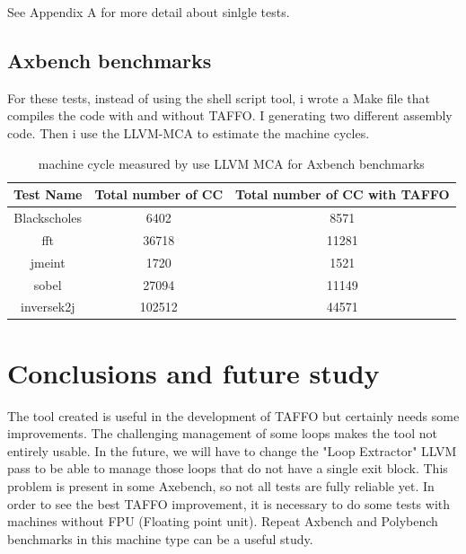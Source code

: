 See Appendix A for more detail about sinlgle tests.
\subsection{Axbench benchmarks}

For these tests, instead of using the shell script tool, i wrote a Make file that compiles the code with and without TAFFO. 
I generating two different assembly code.
Then i use the LLVM-MCA to estimate the machine cycles.

\begin{table}[ht]
\begin{center}
\caption{machine cycle measured by use LLVM MCA for Axbench benchmarks}
\vspace{0.5cm}
\begin{tabular}{ |c|c|c| } 
 \hline
Test Name & Total number of CC & Total number of CC with TAFFO \\
 \hline
  Blackscholes & 6402 & 8571 \\
 \hline
  fft & 36718 & 11281 \\
 \hline
  jmeint & 1720 & 1521 \\
 \hline
  sobel & 27094 & 11149 \\
 \hline
  inversek2j & 102512 & 44571 \\
 \hline
 \end{tabular}
\end{center}
\end{table}

\section{Conclusions and future study}

The tool created is useful in the development of TAFFO but certainly needs some improvements.
The challenging management of some loops makes the tool not entirely usable. In the future, we will have to change the "Loop Extractor" LLVM pass to be able to manage those loops that do not have a single exit block.
This problem is present in some Axebench, so not all tests are fully reliable yet.
In order to see the best TAFFO improvement, it is necessary to do some tests with machines without FPU (Floating point unit). Repeat Axbench and Polybench benchmarks in this machine type can be a useful study.

